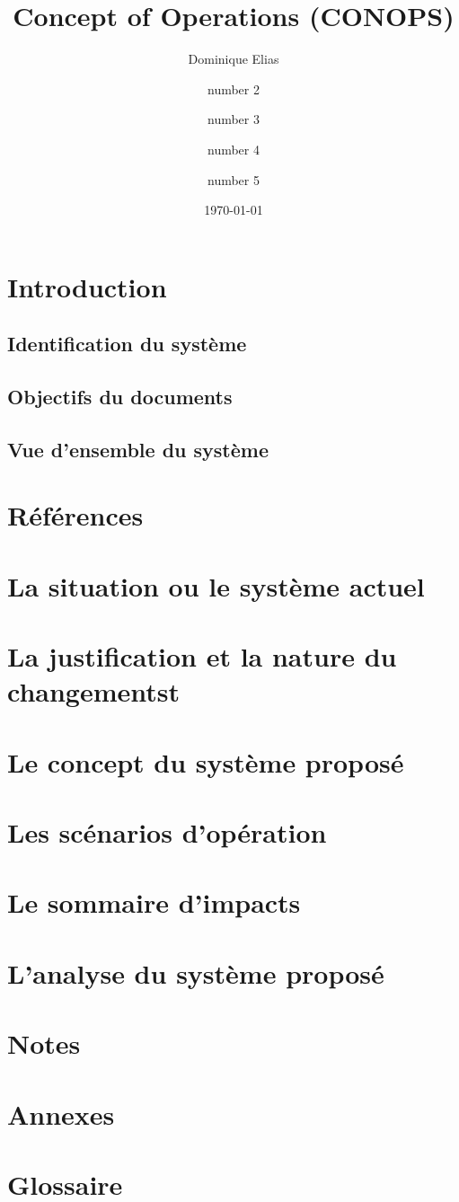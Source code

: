 \documentclass{article}
\title{Concept of Operations (CONOPS)}
\author{Dominique Elias \and number 2 \and number 3 \and number 4 \and number 5}
\date{\today}
\begin{document}
\maketitle

\section{Introduction}

\subsection{Identification du système}

\subsection{Objectifs du documents}

\subsection{Vue d'ensemble du système}

\section{Références}

\section{La situation ou le système actuel}

\section{La justification et la nature du changementst}

\section{Le concept du système proposé}

\section{Les scénarios d'opération}

\section{Le sommaire d'impacts}

\section{L'analyse du système proposé}

\section{Notes}

\section{Annexes}

\section{Glossaire}
\end{document}
